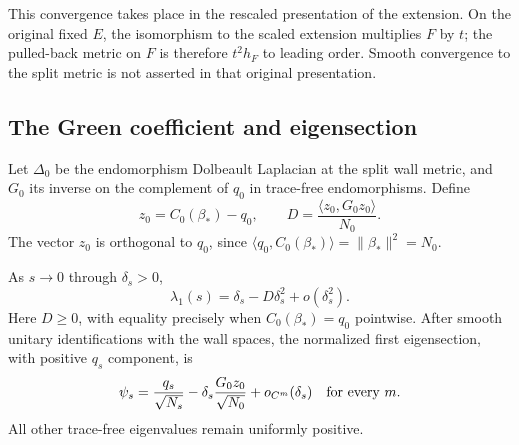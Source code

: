 This convergence takes place in the rescaled presentation of the
extension. On the original fixed $E$, the isomorphism to the scaled
extension multiplies $F$ by $t$; the pulled-back metric on $F$ is
therefore $t^2h_F$ to leading order. Smooth convergence to the split
metric is not asserted in that original presentation.

\subsection{The Green coefficient and eigensection}
Let $\Delta_0$ be the endomorphism Dolbeault Laplacian at the split
wall metric, and $G_0$ its inverse on the complement of $q_0$ in
trace-free endomorphisms. Define
\begin{equation}\label{eq:D-coefficient}
 z_0=C_0(\beta_*)-q_0,\qquad
 D=\frac{\langle z_0,G_0z_0\rangle}{N_0}.
\end{equation}
The vector $z_0$ is orthogonal to $q_0$, since
$\langle q_0,C_0(\beta_*)\rangle=\|\beta_*\|^2=N_0$.

\begin{theorem}\label{thm:second-order}
As $s\to0$ through $\delta_s>0$,
\begin{equation}\label{eq:second-order}
 \lambda_1(s)=\delta_s-D\delta_s^2+o(\delta_s^2).
\end{equation}
Here $D\ge0$, with equality precisely when $C_0(\beta_*)=q_0$
pointwise. After smooth unitary identifications with the wall spaces,
the normalized first eigensection, with positive $q_s$ component, is
\begin{equation}\label{eq:eigensection}
 \psi_s=\frac{q_s}{\sqrt{N_s}}
       -\delta_s\frac{G_0z_0}{\sqrt{N_0}}+o_{C^m}(\delta_s)
 \quad\hbox{for every }m.
\end{equation}
All other trace-free eigenvalues remain uniformly positive.
\end{theorem}

